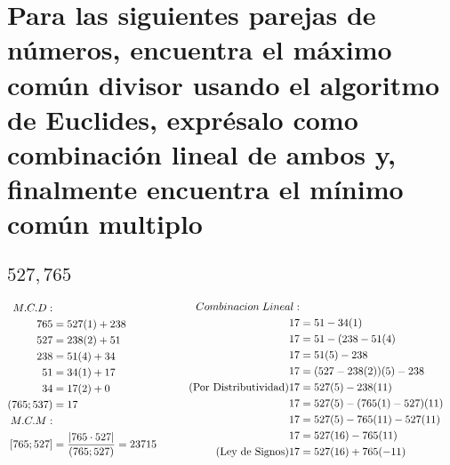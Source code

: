 \documentclass[12pt]{article}
\begin{document}
    \section{Para las siguientes parejas de números, encuentra el máximo común divisor usando el algoritmo de Euclides, exprésalo como combinación lineal de ambos y, finalmente encuentra el mínimo común multiplo}
        \subsection{$527,765$}
            \begin{equation*}
                \begin{aligned}[c]
                    M.C.D: \\
                    765 &= 527 (1) + 238 \\
                    527 &= 238 (2) +51 \\
                    238 &= 51 (4) +34 \\
                    51 &= 34(1) + 17 \\
                    34 &= 17(2) + 0 \\
                    (765;537) &= 17 \\
                    M.C.M: \\
                    \notag [765;527] &= \frac{|765 \cdot 527|}{(765;527)} = 23715
                \end{aligned}
                \begin{aligned}[c]
                Combinacion \; Lineal: \\
                    \notag 17 &= 51-34(1) \\
                    \notag 17 &= 51-(238-51(4) \\
                    \notag 17 &= 51(5) -238 \\
                    \notag 17 &= (527 -238(2))(5)-238 \\
                    \tag{Por Distributividad}17 &= 527(5)-238(11) \\
                    \notag 17 &= 527(5)-(765(1)-527)(11) \\
                    \notag 17 &= 527(5)-765(11)-527(11) \\
                    \notag 17 &= 527(16)-765(11) \\
                    \tag{Ley de Signos} 17 &= 527(16) + 765(-11) \\
                \end{aligned}
            \end{equation*}
\end{document}
